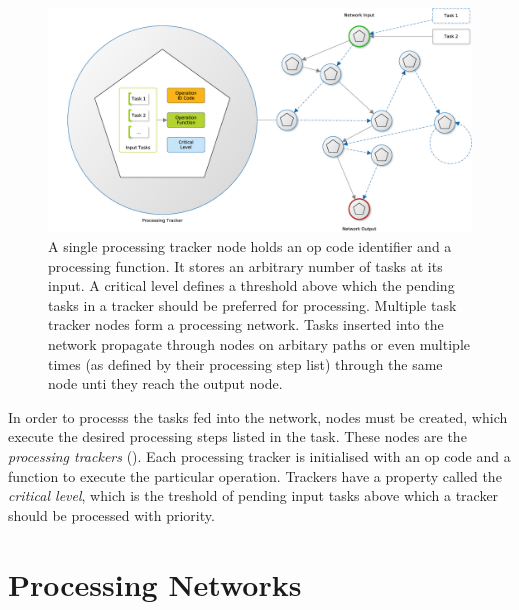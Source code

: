 \begin{figure}%
\begin{center}
	\includegraphics[width=1.0\columnwidth]{images/task_network}
	\caption{A single processing tracker node holds an op code identifier
		and a processing function. It stores an arbitrary number of
		tasks at its input. A critical level defines a threshold above
		which the pending tasks in a tracker should be preferred for
		processing. Multiple task tracker nodes form a processing
		network. Tasks inserted into the network propagate through
		nodes on arbitary paths or even multiple times (as defined by
		their processing step list) through the same node unti they
		reach the output node.}
	\label{fig:task_network}
\end{center}
\end{figure}

In order to processs the tasks fed into the network, nodes must be created,
which execute the desired processing steps listed in the task.  These nodes are
the \emph{processing trackers} (). Each processing
tracker is initialised with an op code and a function to execute the particular
operation. Trackers have a property called the \emph{critical level}, which is
the treshold of pending input tasks above which a tracker should be processed
with priority.


\section{Processing Networks}


